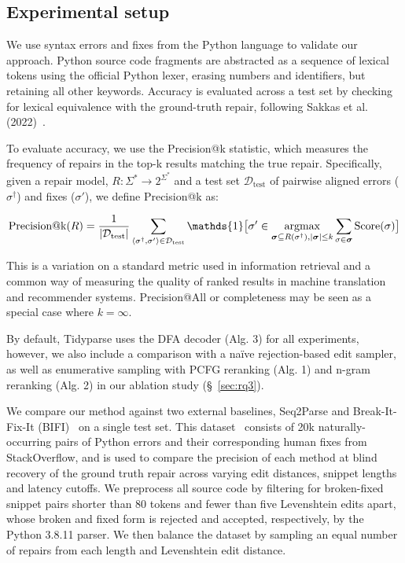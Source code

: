 \documentclass[sigplan,acmsmall,nonacm,screen]{acmart}\settopmatter{printfolios=false,printccs=false,printacmref=false}
\begin{document}
  \subsection{Experimental setup}

  We use syntax errors and fixes from the Python language to validate our approach.  Python source code fragments are abstracted as a sequence of lexical tokens using the official Python lexer, erasing numbers and identifiers, but retaining all other keywords. Accuracy is evaluated across a test set by checking for lexical equivalence with the ground-truth repair, following Sakkas et al. (2022)~\cite{sakkas2022seq2parse}.

  To evaluate accuracy, we use the Precision@k statistic, which measures the frequency of repairs in the top-k results matching the true repair. Specifically, given a repair model, $R: \Sigma^* \rightarrow 2^{\Sigma^*}$ and a test set $\mathcal{D}_{\text{test}}$ of pairwise aligned errors ($\sigma^\dagger$) and fixes ($\sigma'$), we define Precision@k as:

\begin{equation}
\text{Precision@k}(R) = \frac{1}{|\mathcal{D}_{\text{test}}|}\sum_{\langle\sigma^\dagger, \sigma'\rangle \in \mathcal{D}_{\text{test}}} \mathds{1}\big[\sigma' \in \argmax_{\bm{\sigma} \subseteq R(\sigma^\dagger), |\bm{\sigma}| \leq k}\sum_{\sigma \in \bm{\sigma}}\text{Score}(\sigma)\big]
\end{equation}

  This is a variation on a standard metric used in information retrieval and a common way of measuring the quality of ranked results in machine translation and recommender systems. Precision@All or completeness may be seen as a special case where $k=\infty$.

  By default, Tidyparse uses the DFA decoder (Alg. 3) for all experiments, however, we also include a comparison with a na\"ive rejection-based edit sampler, as well as enumerative sampling with PCFG reranking (Alg. 1) and n-gram reranking (Alg. 2) in our ablation study (\S~\ref{sec:rq3}).

  We compare our method against two external baselines, Seq2Parse and Break-It-Fix-It (BIFI)~\cite{yasunaga2021break} on a single test set. This dataset~\cite{wong2019syntax} consists of 20k naturally-occurring pairs of Python errors and their corresponding human fixes from StackOverflow, and is used to compare the precision of each method at blind recovery of the ground truth repair across varying edit distances, snippet lengths and latency cutoffs. We preprocess all source code by filtering for broken-fixed snippet pairs shorter than 80 tokens and fewer than five Levenshtein edits apart, whose broken and fixed form is rejected and accepted, respectively, by the Python 3.8.11 parser. We then balance the dataset by sampling an equal number of repairs from each length and Levenshtein edit distance.
\end{document}
